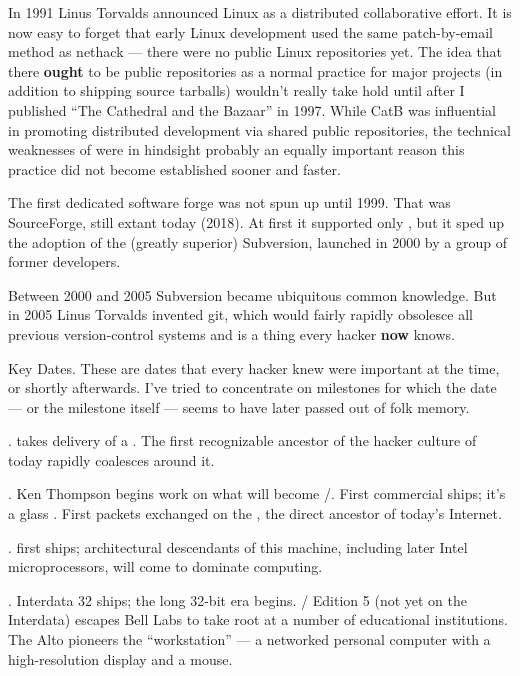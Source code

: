 In 1991 Linus Torvalds announced Linux as a distributed collaborative effort.
It is now easy to forget that early Linux development used the same
patch-by-email method as nethack --- there were no public Linux repositories yet.
The idea that there {\bf ought} to be public repositories as a normal practice for
major projects (in addition to shipping source tarballs) wouldn't really take
hold until after I published ``The Cathedral and the Bazaar'' in 1997. While CatB
was influential in promoting distributed development via shared public
repositories, the technical weaknesses of  were in hindsight probably an
equally important reason this practice did not become established sooner and
faster.

The first dedicated software forge was not spun up until 1999. That was
SourceForge, still extant today (2018). At first it supported only , but it
sped up the adoption of the (greatly superior) Subversion, launched in 2000 by
a group of former  developers.

Between 2000 and 2005 Subversion became ubiquitous common knowledge. But in
2005 Linus Torvalds invented git, which would fairly rapidly obsolesce all
previous version-control systems and is a thing every hacker {\bf now} knows.

\sect Key Dates.
These are dates that every hacker knew were important at the time, or shortly
afterwards. I've tried to concentrate on milestones for which the date --- or the
milestone itself --- seems to have later passed out of folk memory.

.
 takes delivery of a . The first recognizable ancestor of the hacker
culture of today rapidly coalesces around it.

.
Ken Thompson begins work on what will become \UNIX/. First commercial  ships;
it's a glass . First packets exchanged on the , the direct ancestor
of today's Internet.

.
 first ships; architectural descendants of this machine, including
later Intel microprocessors, will come to dominate computing.

.
Interdata 32 ships; the long 32-bit era begins. \UNIX/ Edition 5 (not yet on
the Interdata) escapes Bell Labs to take root at a number of educational
institutions. The  Alto pioneers the ``workstation'' --- a networked personal
computer with a high-resolution display and a mouse.

